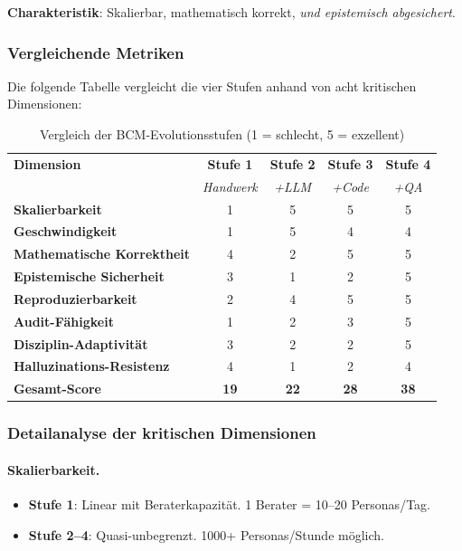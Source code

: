 \textbf{Charakteristik}: Skalierbar, mathematisch korrekt, \textit{und epistemisch abgesichert}.

\subsubsection{Vergleichende Metriken}

Die folgende Tabelle vergleicht die vier Stufen anhand von acht kritischen Dimensionen:

\begin{table}[h]
\centering
\caption{Vergleich der BCM-Evolutionsstufen (1 = schlecht, 5 = exzellent)}
\small
\begin{tabular}{@{}lcccc@{}}
\toprule
\textbf{Dimension} & \textbf{Stufe 1} & \textbf{Stufe 2} & \textbf{Stufe 3} & \textbf{Stufe 4} \\
 & \textit{Handwerk} & \textit{+LLM} & \textit{+Code} & \textit{+QA} \\
\midrule
\textbf{Skalierbarkeit} & 1 & 5 & 5 & 5 \\
\textbf{Geschwindigkeit} & 1 & 5 & 4 & 4 \\
\textbf{Mathematische Korrektheit} & 4 & 2 & 5 & 5 \\
\textbf{Epistemische Sicherheit} & 3 & 1 & 2 & 5 \\
\textbf{Reproduzierbarkeit} & 2 & 4 & 5 & 5 \\
\textbf{Audit-Fähigkeit} & 1 & 2 & 3 & 5 \\
\textbf{Disziplin-Adaptivität} & 3 & 2 & 2 & 5 \\
\textbf{Halluzinations-Resistenz} & 4 & 1 & 2 & 4 \\
\midrule
\textbf{Gesamt-Score} & \textbf{19} & \textbf{22} & \textbf{28} & \textbf{38} \\
\bottomrule
\end{tabular}
\end{table}

\subsubsection{Detailanalyse der kritischen Dimensionen}

\paragraph{Skalierbarkeit.}

\begin{itemize}
    \item \textbf{Stufe 1}: Linear mit Beraterkapazität. 1 Berater = 10--20 Personas/Tag.
    \item \textbf{Stufe 2--4}: Quasi-unbegrenzt. 1000+ Personas/Stunde möglich.
\end{itemize}

